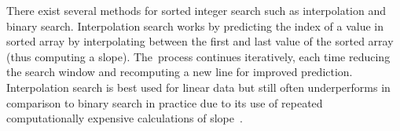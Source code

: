 There exist several methods for sorted integer search such as interpolation and binary search. Interpolation search works by predicting the index of a value in sorted array by interpolating  between the first and last value of the sorted array (thus computing a slope). The~process continues iteratively, each time reducing the search window and recomputing a new line for improved prediction. Interpolation search is best used for linear data but still often underperforms in comparison to binary search in practice due to its use of repeated computationally expensive calculations of slope~\cite{van_sandt_efficiently_2019}.

\vspace{6pt}
